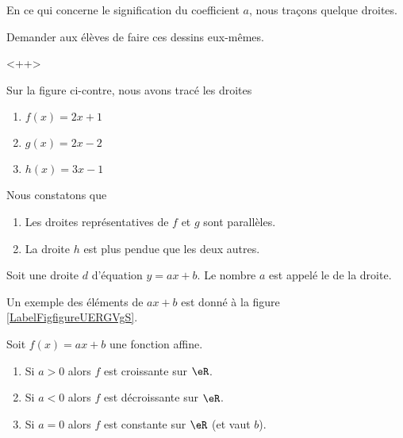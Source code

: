 En ce qui concerne le signification du coefficient \( a\), nous traçons quelque droites.


\begin{remark}
    Demander aux élèves de faire ces dessins eux-mêmes.
\end{remark}
<++>

\newpage
\begin{multicols}{2}
    Sur la figure ci-contre, nous avons tracé les droites
    \begin{enumerate}
        \item
            \( f(x)=2x+1\)
        \item
            \( g(x)=2x-2\)
        \item
            \( h(x)=3x-1\)
    \end{enumerate}

    \columnbreak

    \begin{center}

    \end{center}

\end{multicols}

Nous constatons que
\begin{enumerate}
    \item
        Les droites représentatives de \( f\) et \( g\) sont parallèles.
    \item
        La droite \( h\) est plus pendue que les deux autres.
\end{enumerate}

\begin{definition}
    Soit une droite \( d\) d'équation \( y=ax+b\). Le nombre \( a\) est appelé le  de la droite.
\end{definition}



Un exemple des éléments de \( ax+b\) est donné à la figure \ref{LabelFigfigureUERGVgS}. %
\newcommand{\CaptionFigfigureUERGVgS}{Une droite et quelque éléments de son équation.}


\begin{propriete}
    Soit \( f(x)=ax+b\) une fonction affine.
    \begin{enumerate}
        \item
            Si \( a>0\) alors \( f\) est croissante sur \( \eR\).
        \item
            Si \( a<0\) alors \( f\) est décroissante sur \( \eR\).
        \item
            Si \( a=0\) alors \( f\) est constante sur \( \eR\) (et vaut \( b\)).
    \end{enumerate}
\end{propriete}


